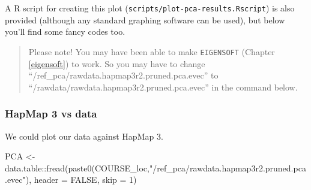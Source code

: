\documentclass[
]{book}
\newenvironment{Shaded}{\begin{snugshade}}{\end{snugshade}}
\newcommand{\AttributeTok}[1]{\textcolor[rgb]{0.77,0.63,0.00}{#1}}
\newcommand{\CommentTok}[1]{\textcolor[rgb]{0.56,0.35,0.01}{\textit{#1}}}
\newcommand{\ConstantTok}[1]{\textcolor[rgb]{0.00,0.00,0.00}{#1}}
\newcommand{\DecValTok}[1]{\textcolor[rgb]{0.00,0.00,0.81}{#1}}
\newcommand{\FunctionTok}[1]{\textcolor[rgb]{0.00,0.00,0.00}{#1}}
\newcommand{\NormalTok}[1]{#1}
\newcommand{\OtherTok}[1]{\textcolor[rgb]{0.56,0.35,0.01}{#1}}
\newcommand{\SpecialCharTok}[1]{\textcolor[rgb]{0.00,0.00,0.00}{#1}}
\newcommand{\StringTok}[1]{\textcolor[rgb]{0.31,0.60,0.02}{#1}}
\begin{document}
A R script for creating this plot (\texttt{scripts/plot-pca-results.Rscript}) is also provided (although any standard graphing software can be used), but below you'll find some fancy codes too.

\begin{quote}
Please note! You may have been able to make \texttt{EIGENSOFT} (Chapter \ref{eigensoft}) to work. So you may have to change ``/ref\_pca/rawdata.hapmap3r2.pruned.pca.evec'' to ``/rawdata/rawdata.hapmap3r2.pruned.pca.evec'' in the command below.
\end{quote}

\hypertarget{hapmap-3-vs-data-1}{%
\subsubsection{HapMap 3 vs data}\label{hapmap-3-vs-data-1}}

We could plot our data against HapMap 3.

\begin{Shaded}
\begin{Highlighting}[]
\NormalTok{PCA }\OtherTok{\textless{}{-}}\NormalTok{ data.table}\SpecialCharTok{::}\FunctionTok{fread}\NormalTok{(}\FunctionTok{paste0}\NormalTok{(COURSE\_loc,}\StringTok{"/ref\_pca/rawdata.hapmap3r2.pruned.pca.evec"}\NormalTok{), }\AttributeTok{header =} \ConstantTok{FALSE}\NormalTok{, }\AttributeTok{skip =} \DecValTok{1}\NormalTok{)}
\end{Highlighting}
\end{Shaded}

\begin{Shaded}
\end{Shaded}
\end{document}
